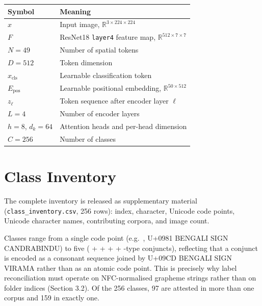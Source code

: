 \begin{center}
\footnotesize
\begin{tabular}{>{\raggedright\arraybackslash}p{}
  >{\raggedright\arraybackslash}p{}}
\toprule
\begin{minipage}[b]{\linewidth}\raggedright
Symbol
\end{minipage} & \begin{minipage}[b]{\linewidth}\raggedright
Meaning
\end{minipage} \\
\midrule
\(x\) & Input image, \(\mathbb{R}^{3 \times 224 \times 224}\) \\
\(F\) & ResNet18 \texttt{layer4} feature map,
\(\mathbb{R}^{512 \times 7 \times 7}\) \\
\(N = 49\) & Number of spatial tokens \\
\(D = 512\) & Token dimension \\
\(x_{\text{cls}}\) & Learnable classification token \\
\(E_{\text{pos}}\) & Learnable positional embedding,
\(\mathbb{R}^{50 \times 512}\) \\
\(z_\ell\) & Token sequence after encoder layer \(\ell\) \\
\(L = 4\) & Number of encoder layers \\
\(h = 8\), \(d_k = 64\) & Attention heads and per-head dimension \\
\(C = 256\) & Number of classes \\
\bottomrule
\end{tabular}
\end{center}


\hypertarget{appendix-b.-class-inventory}{%
\section{Class
Inventory}\label{appendix-b.-class-inventory}}

The complete inventory is released as supplementary material
(\texttt{class\_inventory.csv}, 256 rows): index, character, Unicode
code points, Unicode character names, contributing corpora, and image
count.

Classes range from a single code point (e.g.~, U+0981 BENGALI SIGN
CANDRABINDU) to five ( +  +  +  + -type conjuncts), reflecting that
a conjunct is encoded as a consonant sequence joined by U+09CD BENGALI
SIGN VIRAMA rather than as an atomic code point. This is precisely why
label reconciliation must operate on NFC-normalised grapheme strings
rather than on folder indices (Section 3.2). Of the 256 classes, 97 are
attested in more than one corpus and 159 in exactly one.

